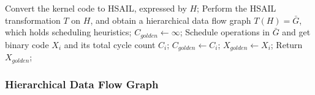 \documentclass[12pt]{article}
\begin{document}
\begin{CJK}{UTF8}{bkai}
\begin{algorithm}[h]
\begin{algorithmic}[1]
                  \State Convert the kernel code to HSAIL, expressed by $H$;
                  \label{line:tohsail}
                  \State Perform the HSAIL transformation $T$ on $H$, and obtain a hierarchical data flow graph $T(H) = \bar{G}$, which holds scheduling heuristics;
                  \label{line:tran}
                  \State $C_{golden} \leftarrow  \infty$;
                  \label{line:optstart}
                    \label{line:forlambda}
                    \State Schedule operations in $\bar{G}$ and get binary code $X_i$ and its total cycle count $C_i$;
                      \State $C_{golden} \leftarrow C_i$;
                      \State $X_{golden} \leftarrow X_i$;
                    \EndIf
                  \EndFor
                  \State Return $X_{golden}$;
                  \label{line:optend}
              \end{algorithmic}
              \label{alg:framework}
            \end{algorithm}

        \subsubsection{Hierarchical Data Flow Graph}
        \label{sec:hdfg}

        

\end{CJK}
\end{document}
